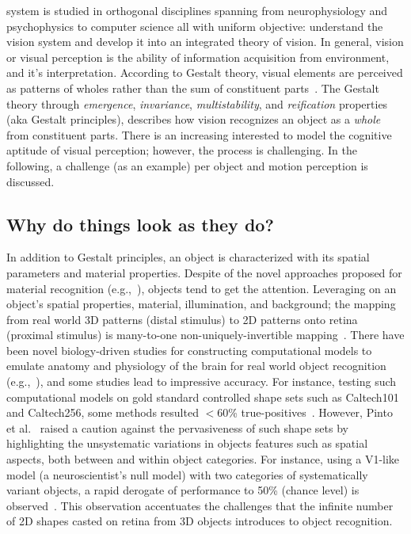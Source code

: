 
 system is studied in orthogonal disciplines spanning from neurophysiology and psychophysics to computer science all with uniform objective: understand the vision system and develop it into an integrated theory of vision. In general, vision or visual perception is the ability of information acquisition from environment, and it's interpretation. According to Gestalt theory, visual elements are perceived as patterns of wholes rather than the sum of constituent parts~\cite{koffka2013principles}. The Gestalt theory through \textit{emergence}, \textit{invariance}, \textit{multistability}, and \textit{reification} properties (aka Gestalt principles), describes how vision recognizes an object as a \textit{whole} from constituent parts. There is an increasing interested to model the cognitive aptitude of visual perception; however, the process is challenging. In the following, a challenge (as an example) per object and motion perception is discussed. 



\subsection{Why do things look as they do?}
In addition to Gestalt principles, an object is characterized with its spatial parameters and material properties. Despite of the novel approaches proposed for material recognition (e.g.,~\cite{sharan2013recognizing}), objects tend to get the attention. Leveraging on an object's spatial properties, material, illumination, and background; the mapping from real world 3D patterns (distal stimulus) to 2D patterns onto retina (proximal stimulus) is many-to-one non-uniquely-invertible mapping~\cite{dicarlo2007untangling,horn1986robot}. There have been novel biology-driven studies for constructing computational models to emulate anatomy and physiology of the brain for real world object recognition (e.g.,~\cite{lowe2004distinctive,serre2007robust,zhang2006svm}), and some studies lead to impressive accuracy. For instance, testing such computational models on gold standard controlled shape sets such as Caltech101 and Caltech256, some methods resulted $<$60\% true-positives~\cite{zhang2006svm,lazebnik2006beyond,mutch2006multiclass,wang2006using}. However, Pinto et al.~\cite{pinto2008real} raised a caution against the pervasiveness of such shape sets by highlighting the unsystematic variations in objects features such as spatial aspects, both between and within object categories. For instance, using a V1-like model (a neuroscientist's null model) with two categories of systematically variant objects, a rapid derogate of performance to 50\% (chance level) is observed~\cite{zhang2006svm}. This observation accentuates the challenges that the infinite number of 2D shapes casted on retina from 3D objects introduces to object recognition. 

